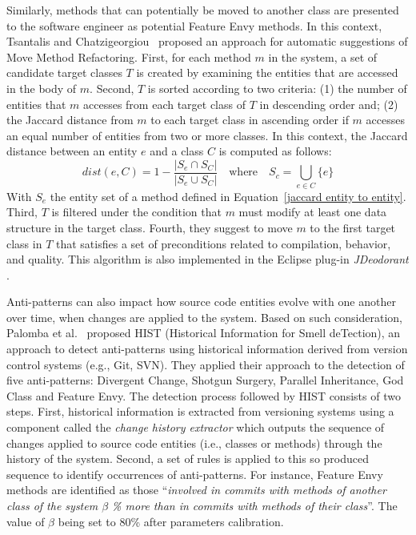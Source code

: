 Similarly, methods that can potentially be moved to another class are presented to the software engineer as potential Feature Envy methods. In this context, Tsantalis and Chatzigeorgiou~\cite{tsantalis2009identification} proposed an approach for automatic suggestions of Move Method Refactoring. First, for each method $m$ in the system, a set of candidate target classes $T$ is created by examining the entities that are accessed in the body of $m$. Second, $T$ is sorted according to two criteria: (1) the number of entities that $m$ accesses from each target class of $T$ in descending order and; (2) the Jaccard distance from $m$ to each target class in ascending order if $m$ accesses an equal number of entities from two or more classes. In this context, the Jaccard distance between an entity $e$ and a class $C$ is computed as follows:
\begin{equation}
\label{jaccard entity to class}
dist(e, C) = 1 - \frac{|S_{e} \cap S_{C}|}{|S_{e} \cup S_{C}|} \quad \textrm{where} \quad S_{c} = \bigcup_{e \in C} \{e\}
\end{equation}
With $S_{e}$ the entity set of a method defined in Equation~\ref{jaccard entity to entity}.
Third, $T$ is filtered under the condition that $m$ must modify at least one data structure in the target class. Fourth, they suggest to move $m$ to the first target class in $T$ that satisfies a set of preconditions related to compilation, behavior, and quality. This algorithm is also implemented in the Eclipse plug-in \textit{JDeodorant} \cite{fokaefs2007jdeodorant}.

Anti-patterns can also impact how source code entities evolve with one another over time, when changes are applied to the system. Based on such consideration, Palomba et al.~\cite{PalombaBPOLP13,Palomba15} proposed HIST (Historical Information for Smell deTection), an approach to detect anti-patterns using historical information derived from version control systems (e.g., Git, SVN). They applied their approach to the detection of five anti-patterns: Divergent Change, Shotgun Surgery, Parallel Inheritance, God Class and Feature Envy. The detection process followed by HIST consists of two steps. First, historical information is extracted from versioning systems using a component called the \textit{change history extractor} which outputs the sequence of changes applied to source code entities (i.e., classes or methods) through the history of the system. Second, a set of rules is applied to this so produced sequence to identify occurrences of anti-patterns. For instance, Feature Envy methods are identified as those ``\textit{involved in commits with methods of another class of the system $\beta$ \% more than in commits with methods of their class}''. The value of $\beta$ being set to 80\% after parameters calibration.

